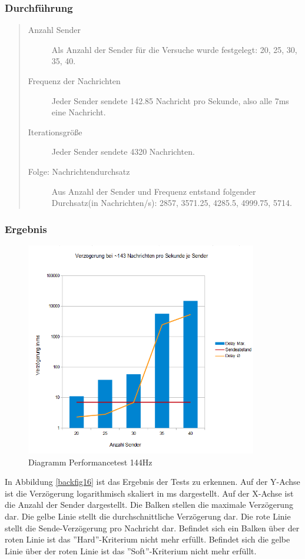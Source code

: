 \subsubsection{Durchführung}
\begin{quote}
  \begin{description}
  \item[Anzahl Sender]
  Als Anzahl der Sender für die Versuche wurde festgelegt: 20, 25, 30, 35, 40.

  \item[Frequenz der Nachrichten]
  Jeder Sender sendete 142.85 Nachricht pro Sekunde, also alle 7ms eine Nachricht.

  \item[Iterationsgröße]
  Jeder Sender sendete 4320 Nachrichten.

  \item[Folge: Nachrichtendurchsatz]
  Aus Anzahl der Sender und Frequenz entstand folgender Durchsatz(in Nachrichten/s): 2857, 3571.25, 4285.5, 4999.75, 5714.
  \end{description}
\end{quote}



\subsubsection{Ergebnis}
\begin{figure}[htH]
\centering
\includegraphics[width=0.9\textwidth]{backend/Diagramm_Performance_144hz.PNG}
\caption{Diagramm Performancetest 144Hz}
\label{backfig18}
\end{figure}
In Abbildung \ref{backfig16} ist das Ergebnis der Tests zu erkennen. 
Auf der Y-Achse ist die Verzögerung logarithmisch skaliert in ms dargestellt.
Auf der X-Achse ist die Anzahl der Sender dargestellt.
Die Balken stellen die maximale Verzögerung dar. 
Die gelbe Linie stellt die durchschnittliche Verzögerung dar.
Die rote Linie stellt die Sende-Verzögerung pro Nachricht dar.
Befindet sich ein Balken über der roten Linie ist das ''Hard''-Kriterium nicht mehr erfüllt.
Befindet sich die gelbe Linie über der roten Linie ist das ''Soft''-Kriterium nicht mehr erfüllt.




